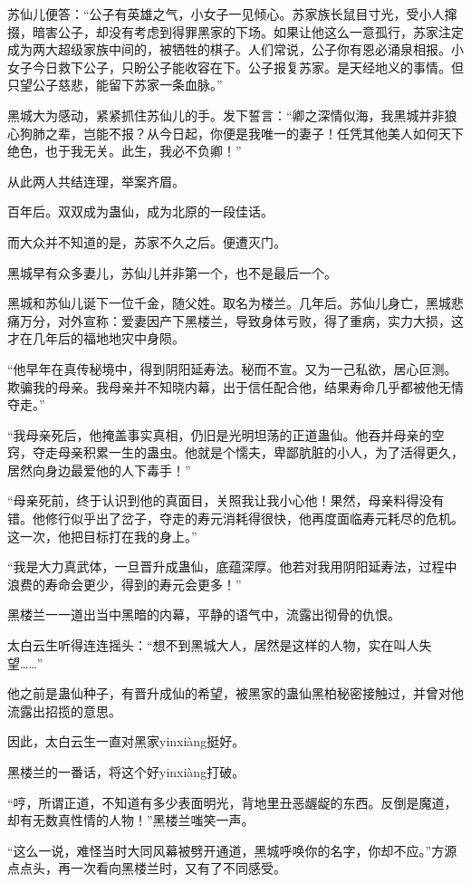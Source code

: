\begin{this_body}
苏仙儿便答：“公子有英雄之气，小女子一见倾心。苏家族长鼠目寸光，受小人撺掇，暗害公子，却没有考虑到得罪黑家的下场。如果让他这么一意孤行，苏家注定成为两大超级家族中间的，被牺牲的棋子。人们常说，公子你有恩必涌泉相报。小女子今日救下公子，只盼公子能收容在下。公子报复苏家。是天经地义的事情。但只望公子慈悲，能留下苏家一条血脉。”

黑城大为感动，紧紧抓住苏仙儿的手。发下誓言：“卿之深情似海，我黑城并非狼心狗肺之辈，岂能不报？从今日起，你便是我唯一的妻子！任凭其他美人如何天下绝色，也于我无关。此生，我必不负卿！”

从此两人共结连理，举案齐眉。

百年后。双双成为蛊仙，成为北原的一段佳话。

而大众并不知道的是，苏家不久之后。便遭灭门。

黑城早有众多妻儿，苏仙儿并非第一个，也不是最后一个。

黑城和苏仙儿诞下一位千金，随父姓。取名为楼兰。几年后。苏仙儿身亡，黑城悲痛万分，对外宣称：爱妻因产下黑楼兰，导致身体亏败，得了重病，实力大损，这才在几年后的福地地灾中身陨。

“他早年在真传秘境中，得到阴阳延寿法。秘而不宣。又为一己私欲，居心叵测。欺骗我的母亲。我母亲并不知晓内幕，出于信任配合他，结果寿命几乎都被他无情夺走。”

“我母亲死后，他掩盖事实真相，仍旧是光明坦荡的正道蛊仙。他吞并母亲的空窍，夺走母亲积累一生的蛊虫。他就是个懦夫，卑鄙肮脏的小人，为了活得更久，居然向身边最爱他的人下毒手！”

“母亲死前，终于认识到他的真面目，关照我让我小心他！果然，母亲料得没有错。他修行似乎出了岔子，夺走的寿元消耗得很快，他再度面临寿元耗尽的危机。这一次，他把目标打在我的身上。”

“我是大力真武体，一旦晋升成蛊仙，底蕴深厚。他若对我用阴阳延寿法，过程中浪费的寿命会更少，得到的寿元会更多！”

黑楼兰一一道出当中黑暗的内幕，平静的语气中，流露出彻骨的仇恨。

太白云生听得连连摇头：“想不到黑城大人，居然是这样的人物，实在叫人失望……”

他之前是蛊仙种子，有晋升成仙的希望，被黑家的蛊仙黑柏秘密接触过，并曾对他流露出招揽的意思。

因此，太白云生一直对黑家yinxiàng挺好。

黑楼兰的一番话，将这个好yinxiàng打破。

“哼，所谓正道，不知道有多少表面明光，背地里丑恶龌龊的东西。反倒是魔道，却有无数真性情的人物！”黑楼兰嗤笑一声。

“这么一说，难怪当时大同风幕被劈开通道，黑城呼唤你的名字，你却不应。”方源点点头，再一次看向黑楼兰时，又有了不同感受。


\end{this_body}
